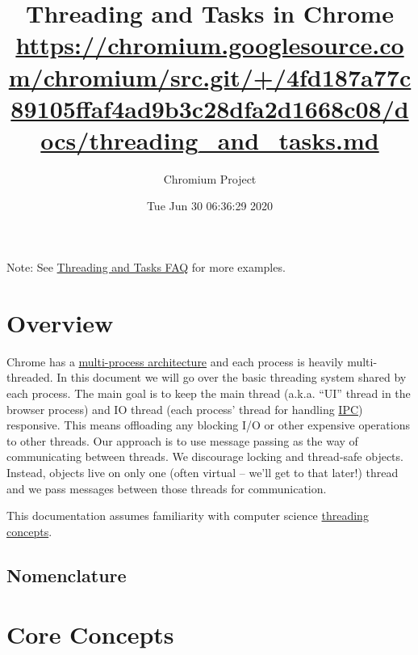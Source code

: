 \documentclass[a4paper,12pt,notitlepage,twoside,openright]{article}
\title{Threading and Tasks in Chrome \\{\footnotesize \url{https://chromium.googlesource.com/chromium/src.git/+/4fd187a77c89105ffaf4ad9b3c28dfa2d1668c08/docs/threading_and_tasks.md}}}
\author{Chromium Project}
\date{Tue Jun 30 06:36:29 2020}
\begin{document}
\maketitle

Note: See \href{threading_and_tasks_faq.md}{Threading and Tasks FAQ} for
more examples.

\hypertarget{overview}{%
\section{Overview}\label{overview}}

Chrome has a
\href{https://www.chromium.org/developers/design-documents/multi-process-architecture}{multi-process
architecture} and each process is heavily multi-threaded. In this
document we will go over the basic threading system shared by each
process. The main goal is to keep the main thread (a.k.a. ``UI'' thread
in the browser process) and IO thread (each process' thread for handling
\href{https://en.wikipedia.org/wiki/Inter-process_communication}{IPC})
responsive. This means offloading any blocking I/O or other expensive
operations to other threads. Our approach is to use message passing as
the way of communicating between threads. We discourage locking and
thread-safe objects. Instead, objects live on only one (often virtual --
we'll get to that later!) thread and we pass messages between those
threads for communication.

This documentation assumes familiarity with computer science
\href{https://en.wikipedia.org/wiki/Thread_(computing)}{threading
concepts}.

\hypertarget{nomenclature}{%
\subsection{Nomenclature}\label{nomenclature}}

\hypertarget{core-concepts}{%
\section{Core Concepts}\label{core-concepts}}
\end{document}
